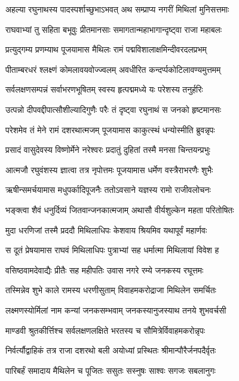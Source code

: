 \twolineshloka
{अहल्या रघुनाथस्य पादस्पर्शाच्छुभाऽभवत्}
{अथ सम्प्राप्य नगरीं मिथिलां मुनिसत्तमाः}%

\twolineshloka
{राघवाभ्यां तु सहिता बभूवुः प्रीतमानसाः}
{समागतान्महाभागान्दृष्ट्वा राजा महाबलः}%

\twolineshloka
{प्रत्युद्गम्य प्रणम्याथ पूजयामास मैथिलः}
{रामं पद्मविशालाक्षमिन्दीवरदलप्रभम्}%

\twolineshloka
{पीताम्बरधरं श्लक्ष्णं कोमलावयवोज्ज्वलम्}
{अवधीरित कन्दर्प्पकोटिलावण्यमुत्तमम्}%

\twolineshloka
{सर्वलक्षणसम्पन्नं सर्वाभरणभूषितम्}
{स्वस्य हृत्पद्ममध्ये यः परेशस्य तनुर्हरिः}%

\twolineshloka
{उत्पन्नो दीपवद्दीपात्सौशील्यादिगुणैः परैः}
{तं दृष्ट्वा रघुनाथं स जनको हृष्टमानसः}%

\twolineshloka
{परेशमेव तं मेने रामं दशरथात्मजम्}
{पूजयामास काकुत्स्थं धन्योस्मीति ब्रुवन्नृपः}%

\twolineshloka
{प्रसादं वासुदेवस्य विष्णोर्मेने नरेश्वरः}
{प्रदातुं दुहितां तस्मै मनसा चिन्तयन्प्रभुः}%

\twolineshloka
{आत्मजौ रघुवंशस्य ज्ञात्वा तत्र नृपोत्तमः}
{पूजयामास धर्मेण वस्त्रैराभरणैः शुभैः}%

\twolineshloka
{ऋषीन्समर्चयामास मधुपर्कादिपूजनैः}
{ततोऽवसाने यज्ञस्य रामो राजीवलोचनः}%

\twolineshloka
{भङ्क्त्वा शैवं धनुर्दिव्यं जितवान्जनकात्मजाम्}
{अथासौ वीर्यशुल्केन महता परितोषितः}%

\twolineshloka
{मुदा धरणिजां तस्मै प्रददौ मिथिलाधिपः}
{केशवाय श्रियमिव यथापूर्वं महार्णवः}%

\twolineshloka
{स दूतं प्रेषयामास राघवं मिथिलाधिपः}
{पुत्राभ्यां सह धर्मात्मा मिथिलायां विवेश ह}%

\twolineshloka
{वसिष्ठवामदेवाद्यैः प्रीतैः सह महीपतिः}
{उवास नगरे रम्ये जनकस्य रघूत्तमः}%

\twolineshloka
{तस्मिन्नेव शुभे काले रामस्य धरणीसुताम्}
{विवाहमकरोद्राजा मिथिलेन समर्चितः}%

\twolineshloka
{लक्ष्मणस्योर्मिलां नाम कन्यां जनकसम्भवाम्}
{जनकस्यानुजस्याथ तनये शुभवर्चसी}%

\twolineshloka
{माण्डवी श्रुतकीर्त्तिश्च सर्वलक्षणलक्षिते}
{भरतस्य च सौमित्रेर्विवाहमकरोन्नृपः}%

\twolineshloka
{निर्वर्त्यौद्वाहिकं तत्र राजा दशरथो बली}
{अयोध्यां प्रस्थितः श्रीमान्पौरैर्जनपदैर्वृतः}%

\twolineshloka
{पारिबर्हं समादाय मैथिलेन च पूजितः}
{ससुतः सस्नुषः साश्वः सगजः सबलानुगः}%

